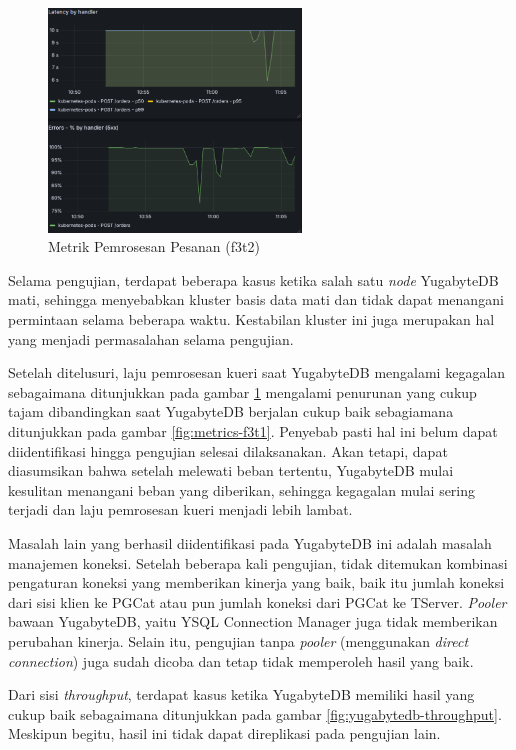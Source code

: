 \begin{figure}[htbp]
    \centering
    \includegraphics[width=0.6\textwidth]{resources/chapter-4/latensi-yugabyte-fail.png}
    \caption{Metrik Pemrosesan Pesanan (f3t2)}
    \label{fig:metrics-f3t2}
\end{figure}

Selama pengujian, terdapat beberapa kasus ketika salah satu \textit{node} YugabyteDB mati, sehingga menyebabkan kluster basis data mati dan tidak dapat menangani permintaan selama beberapa waktu. Kestabilan kluster ini juga merupakan hal yang menjadi permasalahan selama pengujian.

Setelah ditelusuri, laju pemrosesan kueri saat YugabyteDB mengalami kegagalan sebagaimana ditunjukkan pada gambar \ref{fig:metrics-f3t2} mengalami penurunan yang cukup tajam dibandingkan saat YugabyteDB berjalan cukup baik sebagiamana ditunjukkan pada gambar \ref{fig:metrics-f3t1}. Penyebab pasti hal ini belum dapat diidentifikasi hingga pengujian selesai dilaksanakan. Akan tetapi, dapat diasumsikan bahwa setelah melewati beban tertentu, YugabyteDB mulai kesulitan menangani beban yang diberikan, sehingga kegagalan mulai sering terjadi dan laju pemrosesan kueri menjadi lebih lambat.

Masalah lain yang berhasil diidentifikasi pada YugabyteDB ini adalah masalah manajemen koneksi. Setelah beberapa kali pengujian, tidak ditemukan kombinasi pengaturan koneksi yang memberikan kinerja yang baik, baik itu jumlah koneksi dari sisi klien ke PGCat atau pun jumlah koneksi dari PGCat ke TServer. \textit{Pooler} bawaan YugabyteDB, yaitu YSQL Connection Manager juga tidak memberikan perubahan kinerja. Selain itu, pengujian tanpa \textit{pooler} (menggunakan \textit{direct connection}) juga sudah dicoba dan tetap tidak memperoleh hasil yang baik.

Dari sisi \textit{throughput}, terdapat kasus ketika YugabyteDB memiliki hasil yang cukup baik sebagaimana ditunjukkan pada gambar \ref{fig:yugabytedb-throughput}. Meskipun begitu, hasil ini tidak dapat direplikasi pada pengujian lain.

